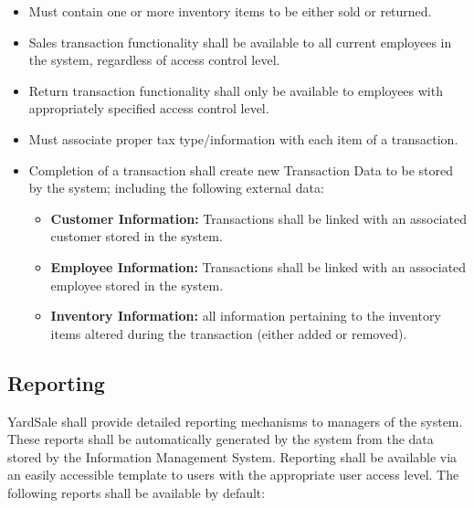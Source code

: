 \documentclass{report}
\begin{document}
            \begin{itemize}
                \item Must contain one or more inventory items to
                be either sold or returned.
                \item Sales transaction functionality shall be available
                to all current employees in the system, regardless
                of access control level.
                \item Return transaction functionality shall only
                be available to employees with appropriately
                specified access control level.
                \item Must associate proper tax type/information
                with each item of a transaction.
                \item Completion of a transaction shall create new
                Transaction Data to be stored by the system;
                including the following external data:
                \begin{itemize}
                    \item {\bf Customer Information:} Transactions
                    shall be linked with an associated customer stored
                    in the system.
                    \item {\bf Employee Information:} Transactions
                    shall be linked with an associated employee stored
                    in the system.
                    \item {\bf Inventory Information:} all information
                    pertaining to the inventory items altered during
                    the transaction (either added or removed).
                \end{itemize}
            \end{itemize}


        \subsection{Reporting}
            YardSale shall provide detailed reporting mechanisms
            to managers of the system.  These reports shall be
            automatically generated by the system from the data stored
            by the Information Management System.  Reporting shall
            be available via an easily accessible template to
            users with the appropriate user access level.  The
            following reports shall be available by default:
\end{document}
